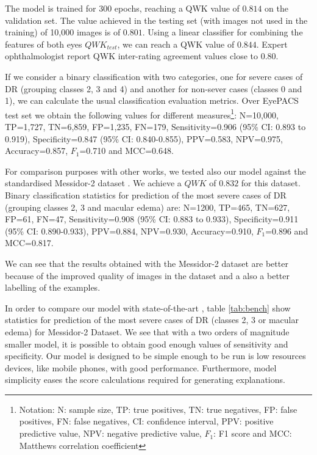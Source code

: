 \documentclass[review]{elsarticle}
\theoremstyle{definition} %
\theoremstyle{remark}
\begin{document}
The model is trained for 300 epochs, reaching a QWK value of $0.814$ on the validation set. The value achieved in the testing set (with images not used in the training) of 10,000 images is of $0.801$. Using a linear classifier for combining the features of both eyes $QWK_{test}$, we can reach a QWK value of $0.844$. Expert ophthalmologist report QWK inter-rating agreement values close to $0.80$. 

If we consider a binary classification with two categories, one for severe cases of DR (grouping classes 2, 3 and 4) and another for non-sever cases (classes 0 and 1), we can calculate the usual classification evaluation metrics. Over EyePACS test set we obtain the following values for different measures\footnote{\label{footn:notation} Notation: N: sample size, TP: true positives, TN: true negatives, FP: false positives, FN: false negatives, CI: confidence interval, PPV: positive predictive value, NPV: negative predictive value, $F_1$: F1 score and MCC: Matthews correlation coefficient}: N=10,000, TP=1,727, TN=6,859, FP=1,235, FN=179, Sensitivity=0.906 (95\% CI: 0.893 to 0.919), Specificity=0.847 (95\% CI: 0.840-0.855), PPV=0.583, NPV=0.975, Accuracy=0.857, $F_1$=0.710 and MCC=0.648.

For comparison purposes with other works, we tested also our model against the standardised Messidor-2 dataset \cite{decenciere_feedback_2014}. We achieve a $QWK$ of $0.832$ for this dataset. Binary classification statistics for prediction of the most severe cases of DR (grouping classes 2, 3 and macular edema) are\footnotemark[\ref{footn:notation}]: N=1200, TP=465, TN=627, FP=61, FN=47, Sensitivity=0.908 (95\% CI: 0.883 to 0.933), Specificity=0.911 (95\% CI: 0.890-0.933), PPV=0.884, NPV=0.930, Accuracy=0.910, $F_1$=0.896 and MCC=0.817. 

We can see that the results obtained with the Messidor-2 dataset are better because of the improved quality of images in the dataset and a also a better labelling of the examples.
			

In order to compare our model with  state-of-the-art \cite{doi:10.1001/jama.2016.17216}, table \ref{tab:bench} show statistics for prediction of the most severe cases of DR (classes 2, 3 or macular edema) for Messidor-2 Dataset. We see that with a two orders of magnitude smaller model, it is possible to obtain good enough values of sensitivity and specificity. Our model is designed to be simple enough to be run is low resources devices, like mobile phones, with good performance. Furthermore, model simplicity eases the score calculations required for generating explanations.
\end{document}
